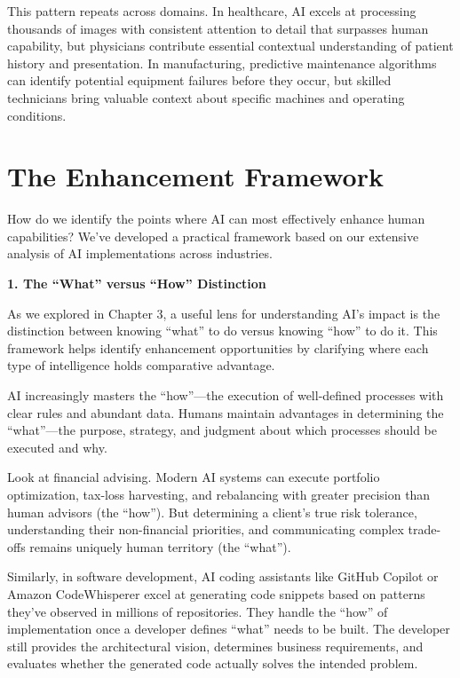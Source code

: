 \documentclass[
  Letterpaper,
]{scrbook}
\begin{document}
This pattern repeats across domains. In healthcare, AI excels at
processing thousands of images with consistent attention to detail that
surpasses human capability, but physicians contribute essential
contextual understanding of patient history and presentation. In
manufacturing, predictive maintenance algorithms can identify potential
equipment failures before they occur, but skilled technicians bring
valuable context about specific machines and operating conditions.

\section{The Enhancement Framework}\label{the-enhancement-framework}

How do we identify the points where AI can most effectively enhance
human capabilities? We've developed a practical framework based on our
extensive analysis of AI implementations across industries.

\textbf{1. The ``What'' versus ``How'' Distinction}

As we explored in Chapter 3, a useful lens for understanding AI's impact
is the distinction between knowing ``what'' to do versus knowing ``how''
to do it. This framework helps identify enhancement opportunities by
clarifying where each type of intelligence holds comparative advantage.

AI increasingly masters the ``how''---the execution of well-defined
processes with clear rules and abundant data. Humans maintain advantages
in determining the ``what''---the purpose, strategy, and judgment about
which processes should be executed and why.

Look at financial advising. Modern AI systems can execute portfolio
optimization, tax-loss harvesting, and rebalancing with greater
precision than human advisors (the ``how''). But determining a client's
true risk tolerance, understanding their non-financial priorities, and
communicating complex trade-offs remains uniquely human territory (the
``what'').

Similarly, in software development, AI coding assistants like GitHub
Copilot or Amazon CodeWhisperer excel at generating code snippets based
on patterns they've observed in millions of repositories. They handle
the ``how'' of implementation once a developer defines ``what'' needs to
be built. The developer still provides the architectural vision,
determines business requirements, and evaluates whether the generated
code actually solves the intended problem.
\end{document}
